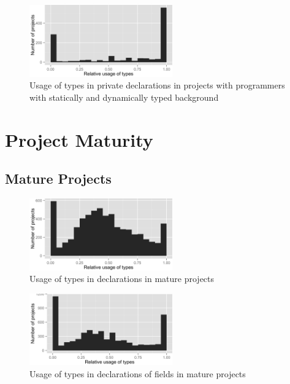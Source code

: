 \begin{figure}[h]
\centering 
\includegraphics[width=0.55\textwidth]{../aosd_2014/analysis/result/background/static-and-dynamic/histograms/11_Private.png} 
\caption{Usage of types in private declarations in projects with programmers with statically and dynamically typed background}
\end{figure}

\FloatBarrier
\section{Project Maturity\label{a:maturity}}

\subsection*{Mature Projects}
\begin{figure}[h]
\centering 
\includegraphics[width=0.55\textwidth]{../aosd_2014/analysis/result/script/class/histograms/5_all_types.png} 
\caption{Usage of types in declarations in mature projects}
\end{figure}

\begin{figure}[h]
\centering 
\includegraphics[width=0.55\textwidth]{../aosd_2014/analysis/result/script/class/histograms/10_Field.png} 
\caption{Usage of types in declarations of fields in mature projects}
\end{figure}

